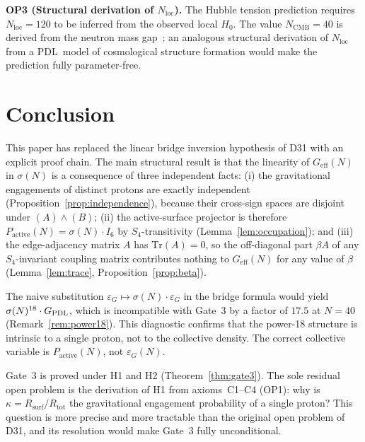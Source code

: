 \documentclass[11pt,a4paper]{article}
\theoremstyle{definition}
\newcommand{\PDL}{\textnormal{PDL}}
\newcommand{\Rsurf}{R_{\mathrm{surf}}}
\newcommand{\Rtot}{R_{\mathrm{tot}}}
\newcommand{\GPDL}{G_{\PDL}}
\newcommand{\Geff}{G_{\mathrm{eff}}}
\newcommand{\sig}{\sigma}
\newcommand{\kap}{\kappa}
\newcommand{\epsg}{\varepsilon_G}
\begin{document}
\textbf{OP3 (Structural derivation of $N_{\mathrm{loc}}$).} The Hubble tension prediction requires $N_{\mathrm{loc}} = 120$ to be inferred from the observed local $H_0$. The value $N_{\mathrm{CMB}} = 40$ is derived from the neutron mass gap~\cite{N_CMB_PDL_2026}; an analogous structural derivation of $N_{\mathrm{loc}}$ from a \PDL\ model of cosmological structure formation would make the prediction fully parameter-free.

\section*{Conclusion}

This paper has replaced the linear bridge inversion hypothesis of D31 with an explicit proof chain. The main structural result is that the linearity of $\Geff(N)$ in $\sig(N)$ is a consequence of three independent facts: (i) the gravitational engagements of distinct protons are exactly independent (Proposition~\ref{prop:independence}), because their cross-sign spaces are disjoint under $(A)\wedge(B)$; (ii) the active-surface projector is therefore $P_{\mathrm{active}}(N) = \sig(N)\cdot I_6$ by $S_4$-transitivity (Lemma~\ref{lem:occupation}); and (iii) the edge-adjacency matrix $A$ has $\mathrm{Tr}(A) = 0$, so the off-diagonal part $\beta A$ of any $S_4$-invariant coupling matrix contributes nothing to $\Geff(N)$ for any value of $\beta$ (Lemma~\ref{lem:trace}, Proposition~\ref{prop:beta}).

The naive substitution $\epsg\mapsto\sig(N)\cdot\epsg$ in the bridge formula would yield $\sig(N)^{18}\cdot\GPDL$, which is incompatible with Gate~3 by a factor of $17.5$ at $N=40$ (Remark~\ref{rem:power18}). This diagnostic confirms that the power-18 structure is intrinsic to a single proton, not to the collective density. The correct collective variable is $P_{\mathrm{active}}(N)$, not $\epsg(N)$.

Gate~3 is proved under H1 and H2 (Theorem~\ref{thm:gate3}). The sole residual open problem is the derivation of H1 from axioms~C1--C4 (OP1): why is $\kap = \Rsurf/\Rtot$ the gravitational engagement probability of a single proton? This question is more precise and more tractable than the original open problem of D31, and its resolution would make Gate~3 fully unconditional.


\nocite{*}

\end{document}
